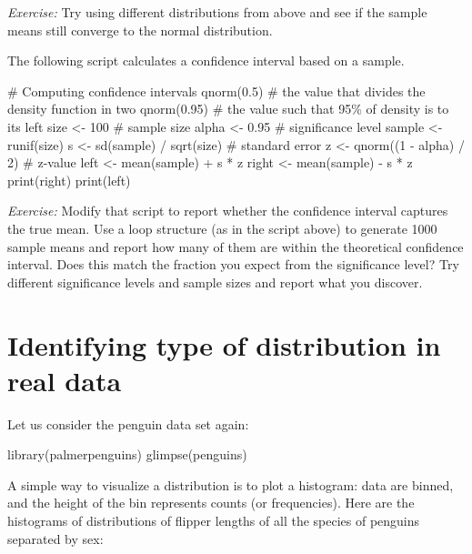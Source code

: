 \documentclass[
  letterpaper,
  DIV=11,
  numbers=noendperiod]{scrreprt}
\newenvironment{Shaded}{\begin{snugshade}}{\end{snugshade}}
\newcommand{\NormalTok}[1]{\textcolor[rgb]{0.00,0.23,0.31}{#1}}
\begin{document}
\emph{Exercise:} Try using different distributions from above and see if
the sample means still converge to the normal distribution.

The following script calculates a confidence interval based on a sample.

\begin{Shaded}
\begin{Highlighting}[]
\NormalTok{\# Computing confidence intervals}
\NormalTok{qnorm(0.5) \# the value that divides the density function in two}
\NormalTok{qnorm(0.95) \# the value such that 95\% of density is to its left }
\NormalTok{size \textless{}{-} 100 \# sample size}
\NormalTok{alpha \textless{}{-} 0.95 \# significance level}
\NormalTok{sample \textless{}{-} runif(size)}
\NormalTok{s \textless{}{-} sd(sample) / sqrt(size) \# standard error}
\NormalTok{z \textless{}{-} qnorm((1 {-} alpha) / 2) \# z{-}value}
\NormalTok{left \textless{}{-} mean(sample) + s * z}
\NormalTok{right \textless{}{-} mean(sample) {-} s * z}
\NormalTok{print(right)}
\NormalTok{print(left)}
\end{Highlighting}
\end{Shaded}

\emph{Exercise:} Modify that script to report whether the confidence
interval captures the true mean. Use a loop structure (as in the script
above) to generate 1000 sample means and report how many of them are
within the theoretical confidence interval. Does this match the fraction
you expect from the significance level? Try different significance
levels and sample sizes and report what you discover.

\section{Identifying type of distribution in real
data}\label{identifying-type-of-distribution-in-real-data}

Let us consider the penguin data set again:

\begin{Shaded}
\begin{Highlighting}[]
\NormalTok{library(palmerpenguins)}
\NormalTok{glimpse(penguins)}
\end{Highlighting}
\end{Shaded}

A simple way to visualize a distribution is to plot a histogram: data
are binned, and the height of the bin represents counts (or
frequencies). Here are the histograms of distributions of flipper
lengths of all the species of penguins separated by sex:
\end{document}
